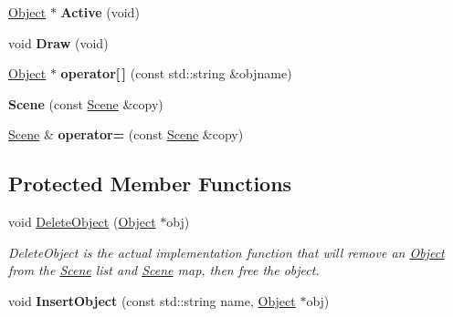 \begin{DoxyCompactItemize}
\item 
\hypertarget{class_scene_a50f6c9e9aa2e243da5e86bf3470c809e}{\hyperlink{class_object}{Object} $\ast$ {\bfseries Active} (void)}\label{class_scene_a50f6c9e9aa2e243da5e86bf3470c809e}

\item 
\hypertarget{class_scene_ad5a91c929b569b9111061eec16b3febf}{void {\bfseries Draw} (void)}\label{class_scene_ad5a91c929b569b9111061eec16b3febf}

\item 
\hypertarget{class_scene_ae9b69d8db8a46991017635f22e45baad}{\hyperlink{class_object}{Object} $\ast$ {\bfseries operator\mbox{[}$\,$\mbox{]}} (const std\-::string \&objname)}\label{class_scene_ae9b69d8db8a46991017635f22e45baad}

\item 
\hypertarget{class_scene_aa6e6354478dc7df82446b3abf9f91d96}{{\bfseries Scene} (const \hyperlink{class_scene}{Scene} \&copy)}\label{class_scene_aa6e6354478dc7df82446b3abf9f91d96}

\item 
\hypertarget{class_scene_a6336263b33b06ce4ace53599ffd8122c}{\hyperlink{class_scene}{Scene} \& {\bfseries operator=} (const \hyperlink{class_scene}{Scene} \&copy)}\label{class_scene_a6336263b33b06ce4ace53599ffd8122c}

\end{DoxyCompactItemize}
\subsection*{Protected Member Functions}
\begin{DoxyCompactItemize}
\item 
void \hyperlink{class_scene_a8bbe0e5b1bfc71034b18e240e86aa285}{Delete\-Object} (\hyperlink{class_object}{Object} $\ast$obj)
\begin{DoxyCompactList}\small\item\em Delete\-Object is the actual implementation function that will remove an \hyperlink{class_object}{Object} from the \hyperlink{class_scene}{Scene} list and \hyperlink{class_scene}{Scene} map, then free the object. \end{DoxyCompactList}\item 
\hypertarget{class_scene_ae8d51ddc196248a7cbd1f3640851dbd4}{void {\bfseries Insert\-Object} (const std\-::string name, \hyperlink{class_object}{Object} $\ast$obj)}\label{class_scene_ae8d51ddc196248a7cbd1f3640851dbd4}

\end{DoxyCompactItemize}
